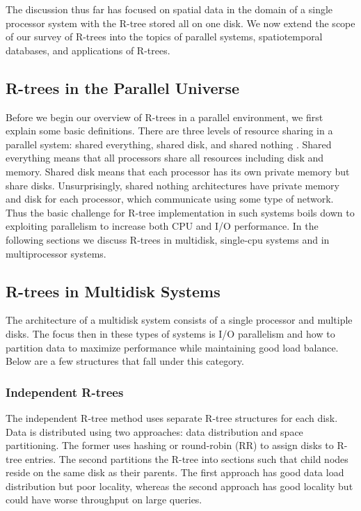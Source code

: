 The discussion thus far has focused on spatial data in the domain of a single
processor system with the R-tree stored all on one disk. We now extend the 
scope of our survey of R-trees into the topics of parallel systems, 
spatiotemporal databases, and applications of R-trees.

\subsection{R-trees in the Parallel Universe}
Before we begin our overview of R-trees in a parallel environment, we first 
explain some basic definitions. There are three levels of resource sharing in
a parallel system: shared everything, shared disk, and shared nothing
\cite{thebook}. Shared everything means that all processors share all 
resources including disk and memory. Shared disk means that each processor 
has its own private memory but share disks. Unsurprisingly, shared nothing 
architectures have private memory and disk for each processor, which
communicate using some type of network. Thus the basic challenge for R-tree 
implementation in such systems boils down to exploiting parallelism to 
increase both CPU and I/O performance. In the following sections we discuss
R-trees in multidisk, single-cpu systems and in multiprocessor systems.

\subsection{R-trees in Multidisk Systems}
The architecture of a multidisk system consists of a single processor and 
multiple disks. The focus then in these types of systems is I/O parallelism
and how to partition data to maximize performance while maintaining good load
balance. Below are a few structures that fall under this category.

\subsubsection{Independent R-trees}
The independent R-tree method \cite{kamel1992parallel}\cite{thebook} uses separate R-tree structures for each disk.
Data is distributed using two approaches: data distribution and space 
partitioning. The former uses hashing or round-robin (RR) to assign disks to
R-tree entries. The second partitions the R-tree into sections such that 
child nodes reside on the same disk as their parents. The first approach 
has good data load distribution but poor locality, whereas the second approach
has good locality but could have worse throughput on large queries.


